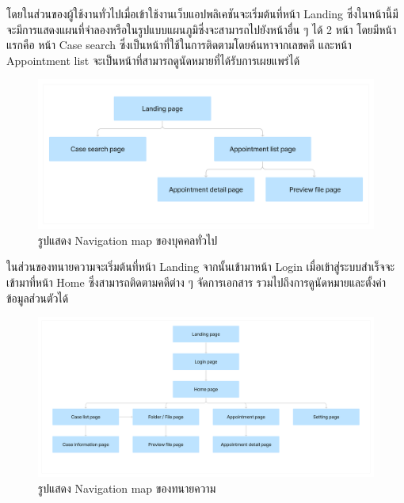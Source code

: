 \documentclass[12pt,oneside,openright,a4paper]{cpe-thai-project}
\begin{document}
\hspace{1cm}โดยในส่วนของผู้ใช้งานทั่วไปเมื่อเข้าใช้งานเว็บแอปพลิเคชันจะเริ่มต้นที่หน้า Landing ซึ่งในหน้านี้มีจะมีการแสดงแผนที่จำลองหรือในรูปแบบแผนภูมิซึ่งจะสามารถไปยังหน้าอื่น ๆ ได้ 2 หน้า โดยมีหน้าแรกคือ 
หน้า Case search ซึ่งเป็นหน้าที่ใช้ในการติดตามโดยค้นหาจากเลขคดี และหน้า Appointment list จะเป็นหน้าที่สามารถดูนัดหมายที่ได้รับการเผยแพร่ได้  \\
\begin{figure}[!ht]\centering
    \includegraphics[width=13cm]{./assets/nav-map-guest.png}
    \caption{รูปแสดง Navigation map ของบุคคลทั่วไป}\label{fig:navMapGuest}

\end{figure}

\hspace{1cm}ในส่วนของทนายความจะเริ่มต้นที่หน้า Landing จากนั้นเข้ามาหน้า Login เมื่อเข้าสู่ระบบสำเร็จจะเข้ามาที่หน้า Home ซึ่งสามารถติดตามคดีต่าง ๆ จัดการเอกสาร รวมไปถึงการดูนัดหมายและตั้งค่าข้อมูลส่วนตัวได้ \\
\begin{figure}[!ht]\centering
    \includegraphics[width=13cm]{./assets/nav-map-lawyer.png}
    \caption{รูปแสดง Navigation map ของทนายความ}\label{fig:navMapLawyer}
\end{figure}

\clearpage
\newpage
\end{document}
